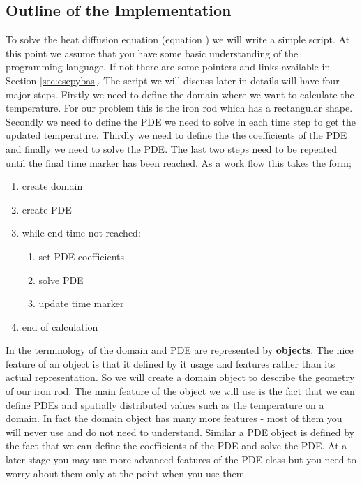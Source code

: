 \subsection{Outline of the Implementation}
\label{sec:outline}
To solve the heat diffusion equation (equation ) we will write a simple \pyt script. At this point we assume that you have some basic understanding of the \pyt programming language. If not there are some pointers and links available in Section \ref{sec:escpybas}. The script we will discuss later in details will have four major steps. Firstly we need to define the domain where we want to 
calculate the temperature. For our problem this is the iron rod which has a rectangular shape. Secondly we need to define the PDE 
we need to solve in each time step to get the updated temperature. Thirdly we need to define the the coefficients of the PDE and finally we need to solve the PDE. The last two steps need to be repeated until the final time marker has been reached. As a work flow this takes the form;
\begin{enumerate}
 \item create domain
 \item create PDE
 \item while end time not reached:
\begin{enumerate}
 \item set PDE coefficients
 \item solve PDE
 \item update time marker
\end{enumerate}
\item end of calculation
\end{enumerate}
In the terminology of \pyt the domain and PDE are represented by \textbf{objects}. The nice feature of an object is that it defined by it usage and features
rather than its actual representation. So we will create a domain object to describe the geometry of our iron rod. The main feature 
of the object we will use is the fact that we can define PDEs and spatially distributed values such as the temperature 
on a domain. In fact the domain object has many more features - most of them you will 
never use and do not need to understand. Similar a PDE object is defined by the fact that we can define the coefficients of the PDE and solve the PDE. At a 
later stage you may use more advanced features of the PDE class but you need to worry about them only at the point when you use them.


